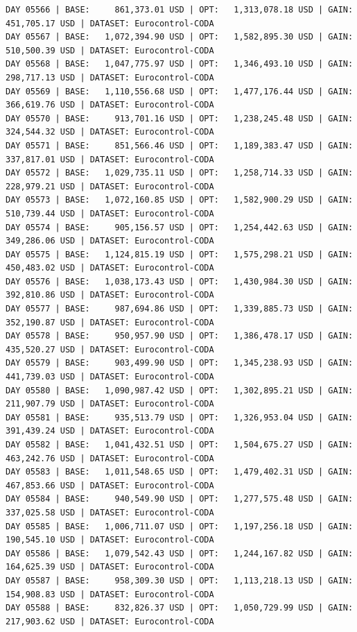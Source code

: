 \documentclass[11pt,a4paper]{article}
\begin{document}
\begin{verbatim}
DAY 05566 | BASE:     861,373.01 USD | OPT:   1,313,078.18 USD | GAIN: 451,705.17 USD | DATASET: Eurocontrol-CODA
DAY 05567 | BASE:   1,072,394.90 USD | OPT:   1,582,895.30 USD | GAIN: 510,500.39 USD | DATASET: Eurocontrol-CODA
DAY 05568 | BASE:   1,047,775.97 USD | OPT:   1,346,493.10 USD | GAIN: 298,717.13 USD | DATASET: Eurocontrol-CODA
DAY 05569 | BASE:   1,110,556.68 USD | OPT:   1,477,176.44 USD | GAIN: 366,619.76 USD | DATASET: Eurocontrol-CODA
DAY 05570 | BASE:     913,701.16 USD | OPT:   1,238,245.48 USD | GAIN: 324,544.32 USD | DATASET: Eurocontrol-CODA
DAY 05571 | BASE:     851,566.46 USD | OPT:   1,189,383.47 USD | GAIN: 337,817.01 USD | DATASET: Eurocontrol-CODA
DAY 05572 | BASE:   1,029,735.11 USD | OPT:   1,258,714.33 USD | GAIN: 228,979.21 USD | DATASET: Eurocontrol-CODA
DAY 05573 | BASE:   1,072,160.85 USD | OPT:   1,582,900.29 USD | GAIN: 510,739.44 USD | DATASET: Eurocontrol-CODA
DAY 05574 | BASE:     905,156.57 USD | OPT:   1,254,442.63 USD | GAIN: 349,286.06 USD | DATASET: Eurocontrol-CODA
DAY 05575 | BASE:   1,124,815.19 USD | OPT:   1,575,298.21 USD | GAIN: 450,483.02 USD | DATASET: Eurocontrol-CODA
DAY 05576 | BASE:   1,038,173.43 USD | OPT:   1,430,984.30 USD | GAIN: 392,810.86 USD | DATASET: Eurocontrol-CODA
DAY 05577 | BASE:     987,694.86 USD | OPT:   1,339,885.73 USD | GAIN: 352,190.87 USD | DATASET: Eurocontrol-CODA
DAY 05578 | BASE:     950,957.90 USD | OPT:   1,386,478.17 USD | GAIN: 435,520.27 USD | DATASET: Eurocontrol-CODA
DAY 05579 | BASE:     903,499.90 USD | OPT:   1,345,238.93 USD | GAIN: 441,739.03 USD | DATASET: Eurocontrol-CODA
DAY 05580 | BASE:   1,090,987.42 USD | OPT:   1,302,895.21 USD | GAIN: 211,907.79 USD | DATASET: Eurocontrol-CODA
DAY 05581 | BASE:     935,513.79 USD | OPT:   1,326,953.04 USD | GAIN: 391,439.24 USD | DATASET: Eurocontrol-CODA
DAY 05582 | BASE:   1,041,432.51 USD | OPT:   1,504,675.27 USD | GAIN: 463,242.76 USD | DATASET: Eurocontrol-CODA
DAY 05583 | BASE:   1,011,548.65 USD | OPT:   1,479,402.31 USD | GAIN: 467,853.66 USD | DATASET: Eurocontrol-CODA
DAY 05584 | BASE:     940,549.90 USD | OPT:   1,277,575.48 USD | GAIN: 337,025.58 USD | DATASET: Eurocontrol-CODA
DAY 05585 | BASE:   1,006,711.07 USD | OPT:   1,197,256.18 USD | GAIN: 190,545.10 USD | DATASET: Eurocontrol-CODA
DAY 05586 | BASE:   1,079,542.43 USD | OPT:   1,244,167.82 USD | GAIN: 164,625.39 USD | DATASET: Eurocontrol-CODA
DAY 05587 | BASE:     958,309.30 USD | OPT:   1,113,218.13 USD | GAIN: 154,908.83 USD | DATASET: Eurocontrol-CODA
DAY 05588 | BASE:     832,826.37 USD | OPT:   1,050,729.99 USD | GAIN: 217,903.62 USD | DATASET: Eurocontrol-CODA

\end{verbatim}
\end{document}
